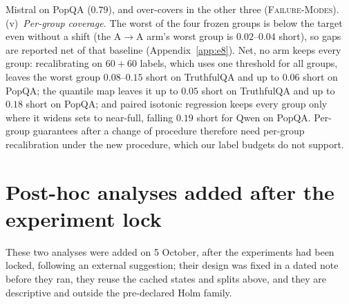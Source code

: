 \documentclass[11pt]{article}
\theoremstyle{definition}
\theoremstyle{remark}
\newcommand{\1}{\mathbf{1}}
\newcommand{\expname}[1]{\textsc{#1}}
\begin{document}
Mistral on PopQA ($0.79$), and over-covers in the other three (\expname{Failure-Modes}).
(v)~\emph{Per-group coverage.} The worst of the four frozen groups is below the target even without a shift
(the A$\to$A arm's worst group is $0.02$--$0.04$ short), so gaps are reported net of that baseline
(Appendix~\ref{app:e8}). Net, no arm keeps every group: recalibrating on $60{+}60$ labels, which uses one
threshold for all groups, leaves the worst group $0.08$--$0.15$ short on TruthfulQA and up to $0.06$ short on
PopQA; the quantile map leaves it up to $0.05$ short on TruthfulQA and up to $0.18$ short on PopQA; and
paired isotonic regression keeps every group only where it widens sets to near-full, falling $0.19$ short for
Qwen on PopQA. Per-group guarantees after a change of procedure therefore need per-group recalibration
under the new procedure, which our label budgets do not support.

\section{Post-hoc analyses added after the experiment lock}
\label{app:postlock}
These
two analyses were added on 5 October, after the experiments had been locked, following an external
suggestion; their design was fixed in a dated note before they ran, they reuse the cached states and splits
above, and they are descriptive and outside the pre-declared Holm family.
\end{document}
